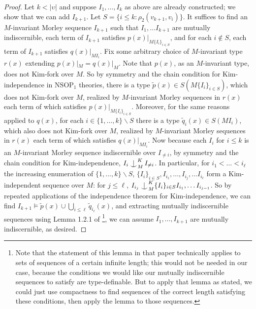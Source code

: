 \documentclass{article}
\theoremstyle{definition}
\theoremstyle{definition}
\theoremstyle{definition}
\def\Ind#1#2{#1\setbox0=\hbox{$#1x$}\kern\wd0\hbox to 0pt{\hss$#1\mid$\hss}
\lower.9\ht0\hbox to 0pt{\hss$#1\smile$\hss}\kern\wd0}
\def\ind{\mathop{\mathpalette\Ind{}}}
\begin{document}
\begin{proof}
Let $k < |\upsilon|$ and suppose $I_{1}, \ldots, I_{k}$ as above are already constructed; we show that we can add $I_{k+1}$. Let $S = \{i \leq k: \rho_{2}(v_{k+1}, v_{i})\}$. It suffices to find an $M$-invariant Morley sequence $I_{k+1}$ such that $I_{1}, \ldots I_{k+1}$ are mutually indiscernible, each term of $I_{k+1}$ satisfies $p(x)|_{M\{I_{i}\}_{i \in S}}$, and for each $i \notin S$, each term of $I_{k+1}$ satisfies $q(x)|_{MI_{i}}$. Fix some arbitrary choice of $M$-invariant type $r(x)$ extending $p(x)|_{M} = q(x)|_{M}$. Note that $p(x)$, as an $M$-invariant type, does not Kim-fork over $M$. So by symmetry and the chain condition for Kim-independence in $\mathrm{NSOP}_{1}$ theories, there is a type $\tilde{p}(x)\in S(M\{I_{i}\}_{i \in S})$, which does not Kim-fork over $M$, realized by $M$-invariant Morley sequences in $r(x)$ each term of which satisfies $p(x)|_{M\{I_{i}\}_{i \in S}}$. Moreover, for the same reasons applied to $q(x)$, for each $i \in \{1, \ldots, k\}\backslash S$ there is a type $\tilde{q}_{i}(x) \in S(MI_{i})$, which also does not Kim-fork over $M$, realized by $M$-invariant Morley sequences in $r(x)$ each term of which satisfies $q(x)|_{MI_{i}}$. Now because each $I_{i}$ for $i \leq k$ is an $M$-invariant Morley sequence indiscernible over $I_{\neq i}$, by symmetry and the chain condition for Kim-independence, $I_{i} \ind_{M}^{K} I_{\neq i}$. In particular, for $i_{1} < \ldots <i_{\ell}$ the increasing enumeration of $\{1, \ldots, k\} \backslash S$, $\{I_{i}\}_{i \in S}, I_{i_{1}}, \ldots, I_{i_{j}}, \ldots I_{i_{\ell}} $ form a Kim-independent sequence over $M$: for $j \leq \ell$, $I_{i_{j}} \ind_{M}^{K} \{I_{i}\}_{i \in S}I_{i_{1}}, \ldots I_{i_{j-1}}$. So by repeated applications of the independence theorem for Kim-independence, we can find $I_{k+1} \models \tilde{p}(x) \cup \bigcup_{i \leq \ell} \tilde{q}_{i_{\ell}}(x)$, and extracting mutually indiscernible sequences using Lemma 1.2.1 of \cite{chernikov2014theories}\footnote{Note that the statement of this lemma in that paper technically applies to sets of sequences of a certain infinite length; this would not be needed in our case, because the conditions we would like our mutually indiscernible sequences to satisfy are type-definable. But to apply that lemma as stated, we could just use compactness to find sequences of the correct length satisfying these conditions, then apply the lemma to those sequences.}, we can assume $I_{1}, \ldots, I_{k+1}$ are mutually indiscernible, as desired.



    
\end{proof}
\end{document}
